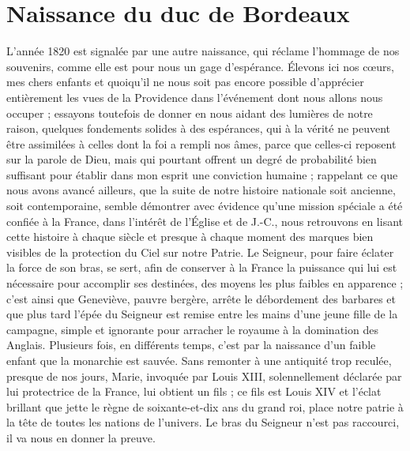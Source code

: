 \documentclass[11pt,a4paper]{report}
\begin{document}
\section*{Naissance du duc de Bordeaux}

L'année 1820 est signalée par une autre naissance, qui réclame l'hommage de nos souvenirs, comme elle est pour nous un gage d'espérance. Élevons ici nos cœurs, mes chers enfants et quoiqu'il ne nous soit pas encore possible d'apprécier entièrement les vues de la Providence dans l'événement dont nous allons nous occuper ; essayons toutefois de donner en nous aidant des lumières de notre raison, quelques fondements solides à des espérances, qui à la vérité ne peuvent être assimilées à celles dont la foi a rempli nos âmes, parce que celles-ci reposent sur la parole de Dieu, mais qui pourtant offrent un degré de probabilité bien suffisant pour établir dans mon esprit une conviction humaine ; rappelant ce que nous avons avancé ailleurs, que la suite de notre histoire nationale soit ancienne, soit contemporaine, semble démontrer avec évidence qu'une mission spéciale a été confiée à la France, dans l'intérêt de l'Église et de J.-C., nous retrouvons en lisant cette histoire à chaque siècle et presque à chaque moment des marques bien visibles de la protection du Ciel sur notre Patrie. Le Seigneur, pour faire éclater la force de son bras, se sert, afin de conserver à la France la puissance qui lui est nécessaire pour accomplir ses destinées, des moyens les plus faibles en apparence ; c'est ainsi que Geneviève, pauvre bergère, arrête le débordement des barbares et que plus tard l'épée du Seigneur est remise entre les mains d'une jeune fille de la campagne, simple et ignorante pour arracher le royaume à la domination des Anglais. Plusieurs fois, en différents temps, c'est par la naissance d'un faible enfant que la monarchie est sauvée. Sans remonter à une antiquité trop reculée, presque de nos jours, Marie, invoquée par Louis XIII, solennellement déclarée par lui protectrice de la France, lui obtient un fils ; ce fils est Louis XIV et l'éclat brillant que jette le règne de soixante-et-dix ans du grand roi, place notre patrie à la tête de toutes les nations de l'univers. Le bras du Seigneur n'est pas raccourci, il va nous en donner la preuve.
\end{document}
